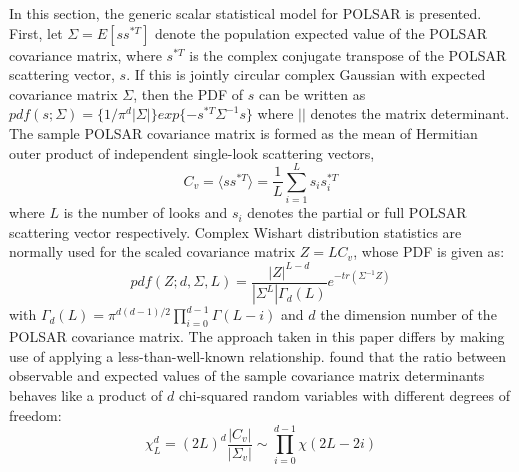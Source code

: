 \documentclass[printer]{tRSL2e}
\begin{document}
In this section, the generic scalar statistical model for POLSAR is presented.
%
%
First, let $\Sigma=E [ss^{*T}]$ denote the population expected value of the POLSAR covariance matrix,
  where $s^{*T}$ is the complex conjugate transpose of the POLSAR scattering vector, $s$. 
If this is jointly circular complex Gaussian with expected covariance matrix $\Sigma$,
  then the PDF of $s$ can be written as
$pdf(s;\Sigma)=\{1/{\pi^d|\Sigma|}\} exp\{-s^{*T}\Sigma^{-1}s\}$
where $||$ denotes the matrix determinant.
%
The sample POLSAR covariance matrix is formed as the mean of Hermitian outer product of independent single-look scattering vectors,
     \vspace{-4mm}
\begin{equation}
  C_v = \langle ss^{*T} \rangle = \frac{1}{L} \sum^L_{i=1}s_is_i^{*T}
\end{equation}
where $L$ is the number of looks
 and $s_i$ denotes the partial or full POLSAR scattering vector respectively.
%
Complex Wishart distribution statistics are normally used for the scaled covariance matrix
$Z=LC_v$, whose PDF is given as:
\begin{equation}
  pdf(Z;d,\Sigma,L)=\frac{|Z|^{L-d}}{|\Sigma^L|\Gamma_d(L)}e^{-tr(\Sigma^{-1}Z)}
\end{equation}
with $\Gamma_d(L) = \pi^{d(d-1)/2} \prod^{d-1}_{i=0}\Gamma(L-i)$
and $d$ the dimension number of the POLSAR covariance matrix.
%
The approach taken in this paper differs by making use of applying a less-than-well-known relationship.
\citet{Goodman_1963_AMS_178} found
that the ratio between observable and expected values of the sample covariance matrix determinants
  behaves like a product of $d$ chi-squared random variables with different degrees of freedom: 
\vspace{-2mm}
\begin{equation}
\chi^d_L = (2L)^d \frac{|C_v|}{|\Sigma_v|} \sim \prod_{i=0}^{d-1} \chi (2L-2i)
\label{eqn:prod_chi_squared_rv}  
\end{equation}
\end{document}
